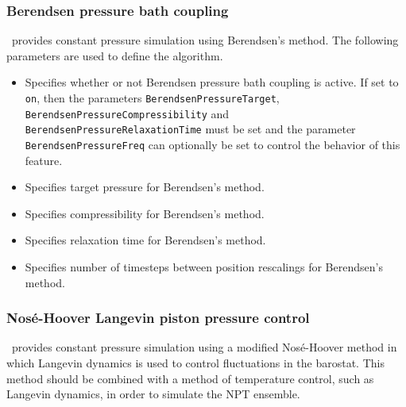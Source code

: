 \subsubsection{Berendsen pressure bath coupling}

\NAMD\ provides constant pressure simulation using Berendsen's method.  
The following parameters are used to define the algorithm.  

\begin{itemize}

\item
{}
{Specifies whether or not Berendsen pressure bath coupling is active.  
If set to {\tt on}, then the parameters {\tt BerendsenPressureTarget}, {\tt BerendsenPressureCompressibility} and {\tt BerendsenPressureRelaxationTime} must be set 
and the parameter {\tt BerendsenPressureFreq} can
optionally be set to control the behavior of this feature.} 

\item
{}
{Specifies target pressure for Berendsen's method.}

\item
{}
{Specifies compressibility for Berendsen's method.}

\item
{}
{Specifies relaxation time for Berendsen's method.}

\item
{}
{Specifies number of timesteps between position rescalings for Berendsen's method.}

\end{itemize}

\subsubsection{Nos\'{e}-Hoover Langevin piston pressure control}

\NAMD\ provides constant pressure simulation using a modified Nos\'{e}-Hoover method in which Langevin dynamics is used to control fluctuations in the barostat.
This method should be combined with a method of temperature control, such as Langevin dynamics, in order to simulate the NPT ensemble.

